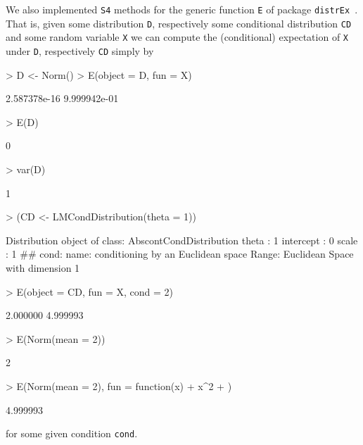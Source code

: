 \documentclass[11pt]{article}
\begin{document}
We also implemented {\tt S4} methods for the generic function {\tt E} of 
package {\tt distrEx}~\cite{distr}. That is, given some distribution {\tt D}, 
respectively some conditional distribution {\tt CD} and some random variable {\tt X}
we can compute the (conditional) expectation of {\tt X} under {\tt D}, respectively 
{\tt CD} simply by
\begin{Schunk}
\begin{Sinput}
> D <- Norm()
> E(object = D, fun = X)
\end{Sinput}
\begin{Soutput}
[1] 2.587378e-16 9.999942e-01
\end{Soutput}
\begin{Sinput}
> E(D)
\end{Sinput}
\begin{Soutput}
[1] 0
\end{Soutput}
\begin{Sinput}
> var(D)
\end{Sinput}
\begin{Soutput}
[1] 1
\end{Soutput}
\begin{Sinput}
> (CD <- LMCondDistribution(theta = 1))
\end{Sinput}
\begin{Soutput}
Distribution object of class: AbscontCondDistribution
theta :  1 
intercept :  0 
scale :  1 
## cond:
name:	conditioning by an Euclidean space
Range:	Euclidean Space with dimension 1
\end{Soutput}
\begin{Sinput}
> E(object = CD, fun = X, cond = 2)
\end{Sinput}
\begin{Soutput}
[1] 2.000000 4.999993
\end{Soutput}
\begin{Sinput}
> E(Norm(mean = 2))
\end{Sinput}
\begin{Soutput}
[1] 2
\end{Soutput}
\begin{Sinput}
> E(Norm(mean = 2), fun = function(x) {
+     x^2
+ })
\end{Sinput}
\begin{Soutput}
[1] 4.999993
\end{Soutput}
\end{Schunk}
for some given condition {\tt cond}.
\par
\end{document}
